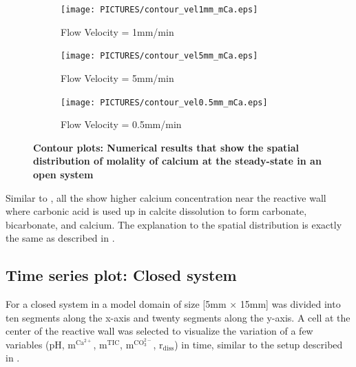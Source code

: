 \begin{figure}[!h]
\centering
    \begin{subfigure}{.5\linewidth}
        \centering
        \texttt{[image: PICTURES/contour\_vel1mm\_mCa.eps]}
        \caption{\small Flow Velocity = 1mm/min}
        \label{fig:CaSteady-state}       %
    \end{subfigure}%
    \hfill
    \begin{subfigure}{.5\linewidth}
        \centering
        \texttt{[image: PICTURES/contour\_vel5mm\_mCa.eps]}
        \caption{\small Flow Velocity = 5mm/min}
        \label{fig:CaSteady-state5mm}       %
    \end{subfigure}%
    \hfill
    \begin{subfigure}{.5\linewidth}
        \centering
        \texttt{[image: PICTURES/contour\_vel0.5mm\_mCa.eps]}
        \caption{\small Flow Velocity = 0.5mm/min}
        \label{fig:CaSteady-state0.5mm}       %
    \end{subfigure}%
    \caption [\DuMuX Contour plots: Numerical results that show the spatial distribution of molality of calcium at the steady-state in an open system] {\textbf{\DuMuX Contour plots: Numerical results that show the spatial distribution of molality of calcium at the steady-state in an open system}}
     \label{fig:contourCa}
\end{figure}

Similar to , all the  show higher 
calcium concentration near the reactive wall where carbonic acid is used up in calcite dissolution to form carbonate, bicarbonate, and calcium. 
The explanation to the spatial distribution is exactly the same as described in .


\subsection{Time series plot: Closed system} \label{ssec:timeSeriesClosed}
For a closed system in \DuMuX a model domain of size [5mm $\times$ 15mm] was divided into ten segments along the x-axis and twenty segments along the y-axis.
A cell at the center of the reactive wall was selected to visualize the variation of a few variables (pH, $\mathrm{m^{Ca^{2+}}}$, $\mathrm{m^{TIC}}$, 
$\mathrm{m^{CO_3^{2-}}}$, $\mathrm{r_{diss}}$) in time, similar to the setup described in .

